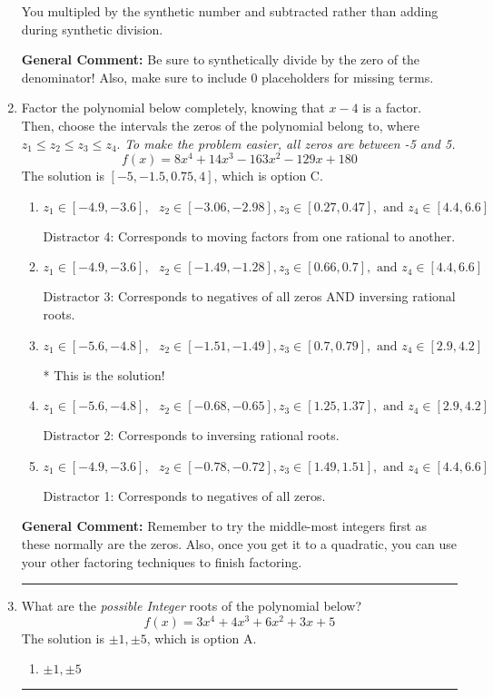 \documentclass{extbook}[14pt]
\newcommand{\litem}[1]{\item #1

\rule{\textwidth}{0.4pt}}
\begin{document}
\begin{enumerate}
{\begin{enumerate}[label=\Alph*.]
 You multipled by the synthetic number and subtracted rather than adding during synthetic division.
\end{enumerate}

\textbf{General Comment:} Be sure to synthetically divide by the zero of the denominator! Also, make sure to include 0 placeholders for missing terms.
}
\litem{
Factor the polynomial below completely, knowing that $x -4$ is a factor. Then, choose the intervals the zeros of the polynomial belong to, where $z_1 \leq z_2 \leq z_3 \leq z_4$. \textit{To make the problem easier, all zeros are between -5 and 5.}
\[ f(x) = 8x^{4} +14 x^{3} -163 x^{2} -129 x + 180 \]The solution is \( [-5, -1.5, 0.75, 4] \), which is option C.\begin{enumerate}[label=\Alph*.]
\item \( z_1 \in [-4.9, -3.6], \text{   }  z_2 \in [-3.06, -2.98], z_3 \in [0.27, 0.47], \text{   and   } z_4 \in [4.4, 6.6] \)

 Distractor 4: Corresponds to moving factors from one rational to another.
\item \( z_1 \in [-4.9, -3.6], \text{   }  z_2 \in [-1.49, -1.28], z_3 \in [0.66, 0.7], \text{   and   } z_4 \in [4.4, 6.6] \)

 Distractor 3: Corresponds to negatives of all zeros AND inversing rational roots.
\item \( z_1 \in [-5.6, -4.8], \text{   }  z_2 \in [-1.51, -1.49], z_3 \in [0.7, 0.79], \text{   and   } z_4 \in [2.9, 4.2] \)

* This is the solution!
\item \( z_1 \in [-5.6, -4.8], \text{   }  z_2 \in [-0.68, -0.65], z_3 \in [1.25, 1.37], \text{   and   } z_4 \in [2.9, 4.2] \)

 Distractor 2: Corresponds to inversing rational roots.
\item \( z_1 \in [-4.9, -3.6], \text{   }  z_2 \in [-0.78, -0.72], z_3 \in [1.49, 1.51], \text{   and   } z_4 \in [4.4, 6.6] \)

 Distractor 1: Corresponds to negatives of all zeros.
\end{enumerate}

\textbf{General Comment:} Remember to try the middle-most integers first as these normally are the zeros. Also, once you get it to a quadratic, you can use your other factoring techniques to finish factoring.
}
\litem{
What are the \textit{possible Integer} roots of the polynomial below?
\[ f(x) = 3x^{4} +4 x^{3} +6 x^{2} +3 x + 5 \]The solution is \( \pm 1,\pm 5 \), which is option A.\begin{enumerate}[label=\Alph*.]
\item \( \pm 1,\pm 5 \)


\end{enumerate}}
\end{enumerate}
\end{document}
